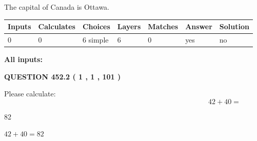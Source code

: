 \documentclass[12pt]{article}
\begin{document}
 
The capital of Canada is Ottawa.
 
 
\noindent{}
 
 
   
   
   
   
\noindent\begin{tabular}{|l|l|l|l|l|l|l|}
 \hline
Inputs & Calculates & Choices & Layers & Matches & Answer & Solution \\ \hline
 0  & 
 0  & 
 6
  simple  
  & 
 6  & 
 0  & 
  yes & 
  no 
  \\ \hline
 \end{tabular}
   
   
   
   
\noindent{}
   
   
   
   
\noindent\vspace{0.1in}\hspace{-0.08in} {\textbf{\Large{All inputs: }}}
   
   
  
\vspace{0.2in}
  
{\textbf{\Large{QUESTION
452.2 
 ( 1 , 1 , 101 )
}}}
  
  
 
Please calculate:
\begin{equation}
42 +  %
40 = \nonumber
\end{equation}
 
 
 
\noindent{}
 
 

82
 
 
\noindent{}
 
 

 
 
 
\noindent{}
 
 

$ %
42 +  %
40=   %
82$
 
 
\noindent{}
 
\end{document}
